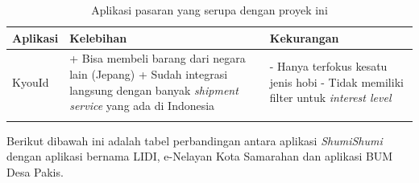 \documentclass[a4paper]{article}
\begin{document}
\begin{longtable}{|m{3cm}|p{5cm}|p{5cm}|}
    \hline
    Aplikasi & Kelebihan                                                  & Kekurangan                \\
    \hline
    KyouId
             & + Bisa membeli barang dari negara lain (Jepang) \newline
    + Sudah integrasi langsung dengan banyak \textit{shipment service} yang ada di Indonesia \newline
             & - Hanya terfokus kesatu jenis hobi \newline
    - Tidak memiliki filter untuk \textit{interest level}                                        \\
    \hline

    \caption{Aplikasi pasaran yang serupa dengan proyek ini}
\end{longtable}
\newpage
Berikut dibawah ini adalah tabel perbandingan antara aplikasi \textit{ShumiShumi} dengan aplikasi bernama LIDI\autocite{lidi-car-rental}, e-Nelayan Kota Samarahan\autocite{fishes-marketplace} dan aplikasi BUM Desa Pakis\autocite{bum-mekarsari}.
\end{document}
